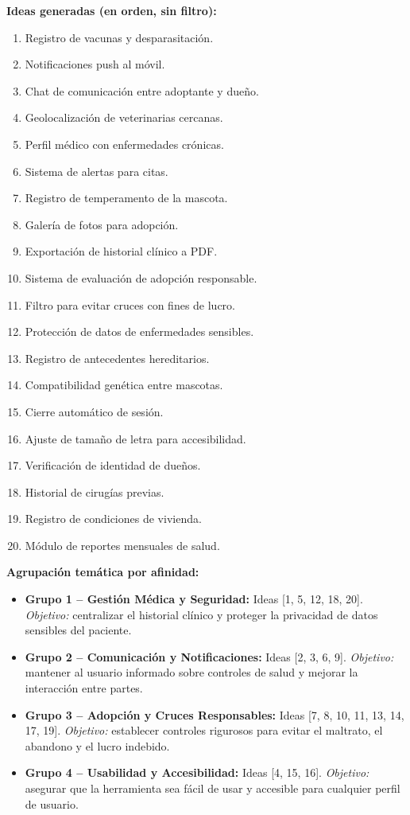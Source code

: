 \documentclass[journal,onecolumn]{IEEEtran}
\begin{document}
\textbf{Ideas generadas (en orden, sin filtro):}
\begin{enumerate}[leftmargin=*]
  \item Registro de vacunas y desparasitación.
  \item Notificaciones push al móvil.
  \item Chat de comunicación entre adoptante y dueño.
  \item Geolocalización de veterinarias cercanas.
  \item Perfil médico con enfermedades crónicas.
  \item Sistema de alertas para citas.
  \item Registro de temperamento de la mascota.
  \item Galería de fotos para adopción.
  \item Exportación de historial clínico a PDF.
  \item Sistema de evaluación de adopción responsable.
  \item Filtro para evitar cruces con fines de lucro.
  \item Protección de datos de enfermedades sensibles.
  \item Registro de antecedentes hereditarios.
  \item Compatibilidad genética entre mascotas.
  \item Cierre automático de sesión.
  \item Ajuste de tamaño de letra para accesibilidad.
  \item Verificación de identidad de dueños.
  \item Historial de cirugías previas.
  \item Registro de condiciones de vivienda.
  \item Módulo de reportes mensuales de salud.
\end{enumerate}

\textbf{Agrupación temática por afinidad:}
\begin{itemize}[leftmargin=*]
  \item \textbf{Grupo 1 -- Gestión Médica y Seguridad:} Ideas [1, 5, 12, 18, 20].
  \textit{Objetivo:} centralizar el historial clínico y proteger la
  privacidad de datos sensibles del paciente.
  \item \textbf{Grupo 2 -- Comunicación y Notificaciones:} Ideas [2, 3, 6, 9].
  \textit{Objetivo:} mantener al usuario informado sobre controles de salud
  y mejorar la interacción entre partes.
  \item \textbf{Grupo 3 -- Adopción y Cruces Responsables:} Ideas
  [7, 8, 10, 11, 13, 14, 17, 19]. \textit{Objetivo:} establecer controles
  rigurosos para evitar el maltrato, el abandono y el lucro indebido.
  \item \textbf{Grupo 4 -- Usabilidad y Accesibilidad:} Ideas [4, 15, 16].
  \textit{Objetivo:} asegurar que la herramienta sea fácil de usar y
  accesible para cualquier perfil de usuario.
\end{itemize}
\end{document}
